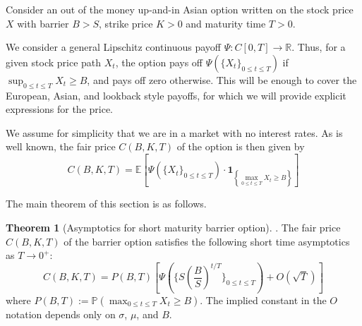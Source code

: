 \documentclass{article}
\theoremstyle{definition}
\newtheorem{theorem}{Theorem}
\theoremstyle{definition}
\begin{document}
Consider an out of the money up-and-in Asian option written on the stock price $X$ with barrier $B>S$, strike price $K>0$ and maturity time $T>0$. 

We consider a general Lipschitz continuous payoff $\Psi: C[0, T] \to \mathbb R$. Thus, for a given stock price path $X_t$, the option pays off $\Psi(\{X_t\}_{0 \leq t \leq T})$ if $\sup_{0 \leq t \leq T} X_t \geq B$, and pays off zero otherwise. This will be enough to cover the European, Asian, and lookback style payoffs, for which we will provide explicit expressions for the price.

We assume for simplicity that we are in a market with no interest rates. As is well known, the fair price $C(B, K, T)$ of the option is then given by
$$
C(B, K, T)=\mathbb{E}\left[\Psi(\{X_t\}_{0 \leq t \leq T}) \cdot \mathbf{1}_{\left\{\max _{0 \leq t \leq T} X_{t} \geq B\right\}}\right]
$$

The main theorem of this section is as follows.
\begin{theorem}[Asymptotics for short maturity barrier option]. The fair price $C(B, K, T)$ of the barrier option satisfies the following short time asymptotics as $T \rightarrow 0^{+}$:
$$
C(B, K, T)=P(B, T)\left[\Psi(\{S(\frac{B}{S})^{t/T}\}_{0 \leq t \leq T}) +O(\sqrt{T})\right]
$$
where $P(B, T):=\mathbb{P}\left(\max _{0 \leq t \leq T} X_{t} \geq B\right)$. The implied constant in the $O$ notation depends only on $\sigma$, $\mu$, and $B$.
\end{theorem}
\end{document}
